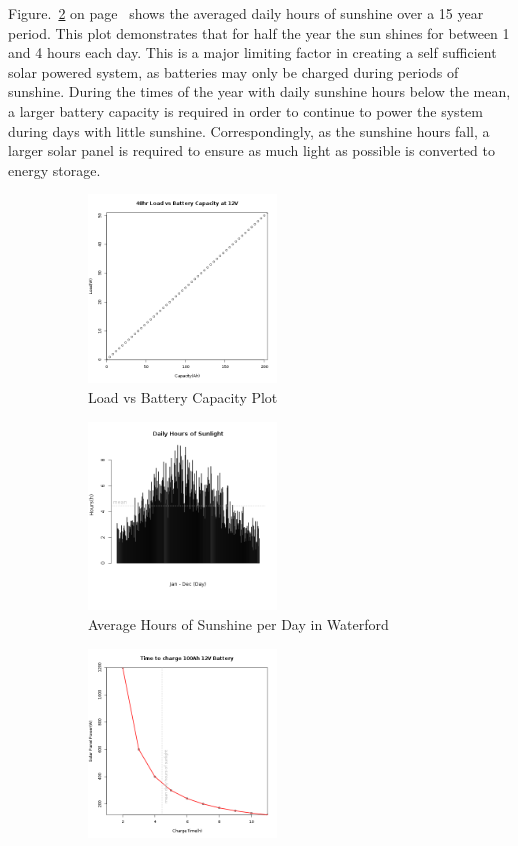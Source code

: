 
Figure.~\ref{fig:barplot_hours_sunshine_waterford} on page~\pageref{fig:barplot_hours_sunshine_waterford} shows the averaged daily hours of sunshine over a 15 year period. This plot demonstrates that for half the year the sun shines for between 1 and 4 hours each day. This is a major limiting factor in creating a self sufficient solar powered system, as batteries may only be charged during periods of sunshine. During the times of the year with daily sunshine hours below the mean, a larger battery capacity is required in order to continue to power the system during days with little sunshine. Correspondingly, as the sunshine hours fall, a larger solar panel is required to ensure as much light as possible is converted to energy storage.

%
\begin{figure}	
	\centering
	\begin{subfigure}[t]{5cm}
		\centering
		\includegraphics[width=5cm]{images/64}
		\caption{Load vs Battery Capacity Plot}
		\label{fig:lineplot_load_battery_capacity}		
	\end{subfigure}
	\quad
	\begin{subfigure}[t]{5cm}
		\centering
		\includegraphics[width=5cm]{images/66}
		\caption{Average Hours of Sunshine per Day in Waterford}
		\label{fig:barplot_hours_sunshine_waterford}
	\end{subfigure}
	\quad
	\begin{subfigure}[t]{5cm}
		\centering
		\includegraphics[width=5cm]{images/65}

\end{subfigure}
\end{figure}
